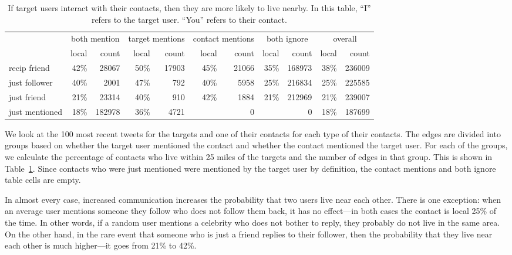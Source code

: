 \begin{table}[tbh]
\scriptsize
\centering
\begin{tabular}{l | r r | r r | r r | r r | r r}
    & \multicolumn{2}{c}{both mention}
    & \multicolumn{2}{|c}{target mentions}
    & \multicolumn{2}{|c}{contact mentions}
    & \multicolumn{2}{|c}{both ignore}
    & \multicolumn{2}{|c}{overall} \\
    \cline{2-11}
    &local&count&local&count&local&count&local&count&local&count \\
    \hline
    recip friend & 42\%&28067 & 50\%&17903 & 45\%&21066 & 35\%&168973 & 38\%&236009 \\
    just follower & 40\%&2001 & 47\%&792 & 40\%&5958 & 25\%&216834 & 25\%&225585 \\
    just friend & 21\%&23314 & 40\%&910 & 42\%&1884 & 21\%&212969 & 21\%&239007 \\
    just mentioned & 18\%&182978 & 36\%&4721 & & 0 & & 0 & 18\%&187699 \\
\end{tabular}
\caption{
If target users interact with their contacts, then they are more likely to
live nearby.
%
In this table, ``I'' refers to the target user. ``You'' refers to their
contact.
%
}
\label{tab:ComTypes}
\end{table}


We look at the 100 most recent tweets for the targets and one of their
contacts for each type of their contacts.
%
The edges are divided into groups based on whether the target user
mentioned the contact and whether the contact mentioned the target user.
%
For each of the groups, we calculate the percentage of contacts who
live within 25 miles of the targets and the number of edges in that group.
%
This is shown in Table~\ref{tab:ComTypes}.
%
Since contacts who were just mentioned were mentioned by the target
user by definition, the contact mentions and both ignore table cells are
empty.

In almost every case, increased communication increases the probability that
two users live near each other.
%
There is one exception: when an average user mentions someone they follow who
does not follow them back, it has no effect---in both cases the contact is
local 25\% of the time.
%
In other words, if a random user mentions a celebrity who does not bother to
reply, they probably do not live in the same area.
%
On the other hand, in the rare event that someone who is just a friend replies
to their follower, then the probability that they live near each other is much
higher---it goes from 21\% to 42\%.

